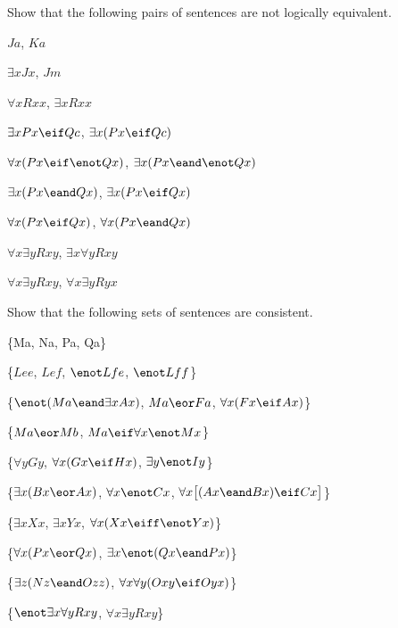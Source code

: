 \problempart
\label{pr.NotEquiv}
Show that the following pairs of sentences are not logically equivalent.
\begin{earg}
\item $Ja$, $Ka$
\item $\exists x Jx$, $Jm$
\item $\forall x Rxx$, $\exists x Rxx$
\item $\exists x Px \eif Qc$, $\exists x (Px \eif Qc)$
\item $\forall x(Px \eif \enot Qx)$, $\exists x(Px \eand \enot Qx)$
\item $\exists x(Px \eand Qx)$, $\exists x(Px \eif Qx)$
\item $\forall x(Px\eif Qx)$, $\forall x(Px \eand Qx)$
\item $\forall x\exists y Rxy$, $\exists x\forall y Rxy$
\item $\forall x\exists y Rxy$, $\forall x\exists y Ryx$
\end{earg}



\problempart
Show that the following sets of sentences are consistent.
\begin{earg}
\item \{Ma, \enot Na, Pa, \enot Qa\}
\item \{$Lee$, $Lef$, $\enot Lfe$, $\enot Lff$\}
\item \{$\enot (Ma \eand \exists x Ax)$, $Ma \eor Fa$, $\forall x(Fx \eif Ax)$\}
\item \{$Ma \eor Mb$, $Ma \eif \forall x \enot Mx$\}
\item \{$\forall y Gy$, $\forall x (Gx \eif Hx)$, $\exists y \enot Iy$\}
\item \{$\exists x(Bx \eor Ax)$, $\forall x \enot Cx$, $\forall x\bigl[(Ax \eand Bx) \eif Cx\bigr]$\}
\item \{$\exists x Xx$, $\exists x Yx$, $\forall x(Xx \eiff \enot Yx)$\}
\item \{$\forall x(Px \eor Qx)$, $\exists x\enot(Qx \eand Px)$\}
\item \{$\exists z(Nz \eand Ozz)$, $\forall x\forall y(Oxy \eif Oyx)$\}
\item \{$\enot \exists x \forall y Rxy$, $\forall x \exists y Rxy$\}
\end{earg}


